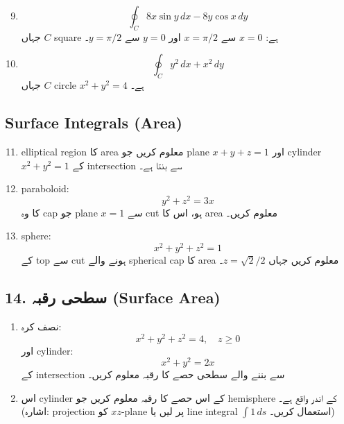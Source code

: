\begin{enumerate}
\begin{enumerate}
\setcounter{enumi}{8}

\item
\[
\oint_C 8x\sin y\,dx - 8y\cos x\,dy
\]
جہاں \( C \) square ہے: \( x=0 \) سے \( x=\pi/2 \) اور \( y=0 \) سے \( y=\pi/2 \)۔

\item
\[
\oint_C y^2\,dx + x^2\,dy
\]
جہاں \( C \) circle \( x^2+y^2=4 \) ہے۔

\end{enumerate}

\subsection*{Surface Integrals (Area)}

\begin{enumerate}
\setcounter{enumi}{10}

\item elliptical region کا area معلوم کریں جو plane \( x+y+z=1 \) اور cylinder \( x^2+y^2=1 \) کے intersection سے بنتا ہے۔

\item paraboloid:
\[
y^2+z^2=3x
\]
کا وہ cap جو plane \( x=1 \) سے cut ہو، اس کا area معلوم کریں۔

\item sphere:
\[
x^2+y^2+z^2=1
\]
کے top سے cut ہونے والے spherical cap کا area معلوم کریں جہاں \( z=\sqrt{2}/2 \)۔

\end{enumerate}


\subsection*{14. سطحی رقبہ (Surface Area)}

\begin{enumerate}
\item[a.] نصف کرہ:
\[
x^2 + y^2 + z^2 = 4,\quad z \ge 0
\]
اور cylinder:
\[
x^2 + y^2 = 2x
\]
کے intersection سے بننے والے سطحی حصے کا رقبہ معلوم کریں۔

\item[b.] اس cylinder کے اس حصے کا رقبہ معلوم کریں جو hemisphere کے اندر واقع ہے۔  
(اشارہ: projection کو \( xz \)-plane پر لیں یا line integral \( \int 1\, ds \) استعمال کریں۔)
\end{enumerate}

\bigskip


\end{enumerate}
